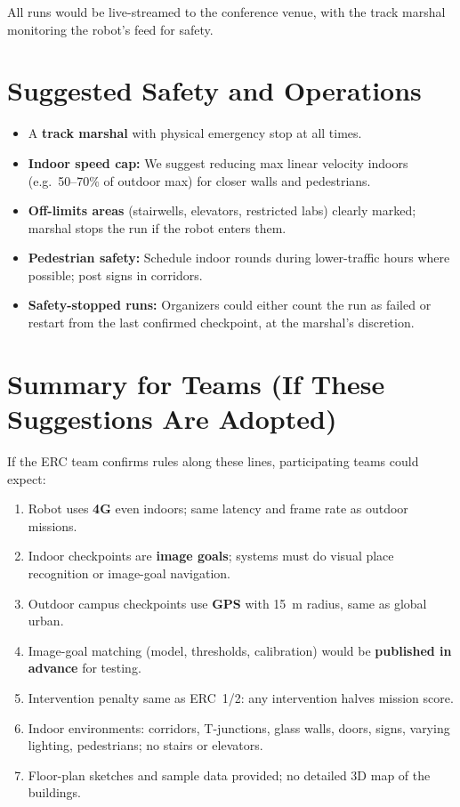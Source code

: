 \documentclass[11pt,a4paper]{article}
\begin{document}
All runs would be live-streamed to the conference venue, with the track marshal monitoring the robot's feed for safety.


\section{Suggested Safety and Operations}

\begin{itemize}
    \item A \textbf{track marshal} with physical emergency stop at all times.
    \item \textbf{Indoor speed cap:} We suggest reducing max linear velocity indoors (e.g.\ 50--70\% of outdoor max) for closer walls and pedestrians.
    \item \textbf{Off-limits areas} (stairwells, elevators, restricted labs) clearly marked; marshal stops the run if the robot enters them.
    \item \textbf{Pedestrian safety:} Schedule indoor rounds during lower-traffic hours where possible; post signs in corridors.
    \item \textbf{Safety-stopped runs:} Organizers could either count the run as failed or restart from the last confirmed checkpoint, at the marshal's discretion.
\end{itemize}


\section{Summary for Teams (If These Suggestions Are Adopted)}

If the ERC team confirms rules along these lines, participating teams could expect:

\begin{enumerate}
    \item Robot uses \textbf{4G} even indoors; same latency and frame rate as outdoor missions.
    \item Indoor checkpoints are \textbf{image goals}; systems must do visual place recognition or image-goal navigation.
    \item Outdoor campus checkpoints use \textbf{GPS} with 15~m radius, same as global urban.
    \item Image-goal matching (model, thresholds, calibration) would be \textbf{published in advance} for testing.
    \item Intervention penalty same as ERC~1/2: any intervention halves mission score.
    \item Indoor environments: corridors, T-junctions, glass walls, doors, signs, varying lighting, pedestrians; no stairs or elevators.
    \item Floor-plan sketches and sample data provided; no detailed 3D map of the buildings.
\end{enumerate}
\end{document}
